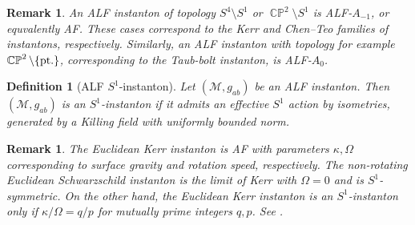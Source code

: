 \documentclass[a4paper,10pt,reqno]{amsart}
\newcommand{\cM}{\mathcal{M}}
\theoremstyle{plain}
\newtheorem{definition}[thm]{Definition}
\newtheorem{remark}[thm]{Remark}
\DeclareMathOperator{\CP}{\mathbb{C}\mathbb{P}}
\numberwithin{equation}{section}
\begin{document}
\begin{remark} 
An ALF instanton of topology $S^4 \setminus S^1$ or $\CP^2\setminus S^1$ is ALF-$A_{-1}$, or equvalently AF. These cases correspond to the Kerr and Chen--Teo families of instantons, respectively. Similarly, an ALF instanton with topology for example $\CP^2 \setminus \{\text{\rm pt.}\}$, corresponding to the Taub-bolt instanton,
is ALF-$A_0$. 
\end{remark}  

\begin{definition}[ALF $S^1$-instanton]\label{def:S1inst}
Let $(\cM, g_{ab})$ be an ALF instanton. Then $(\cM, g_{ab})$ is an $S^1$-instanton if it admits an effective $S^1$ action by isometries, generated by a Killing field with uniformly bounded norm.
\end{definition}

\begin{remark}
The Euclidean Kerr instanton is AF with parameters $\kappa, \Omega$ corresponding to surface gravity and rotation speed, respectively. The non-rotating Euclidean Schwarzschild instanton is the limit of Kerr with $\Omega = 0$ and is $S^1$-symmetric. On the other hand, the Euclidean Kerr instanton is an $S^1$-instanton only if $\kappa/\Omega = q/p$ for mutually prime integers $q,p$. See \cite{1998PhRvD..59b4009H}.
\end{remark}
\end{document}
